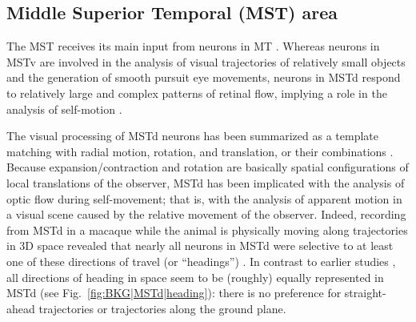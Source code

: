 \subsection{Middle Superior Temporal (MST) area}
\label{sec:BKG|MST}


The \ac{MST} receives its main input from neurons in \ac{MT}
\citep{UngerleiderDesimone1986}.
Whereas neurons in \ac{MSTv} are involved in the analysis of visual
trajectories of relatively small objects and the generation of
smooth pursuit eye movements, 
neurons in \ac{MSTd} respond to relatively large and complex patterns of
retinal flow, implying a role in the analysis of self-motion
\citep{Saito1986, TanakaSaito1989, DuffyWurtz1991a, DuffyWurtz1991b, Gu2010,
Gu2012}.

The visual processing of \ac{MSTd} neurons has been summarized as a
template matching with radial motion, rotation, and translation,
or their combinations \citep{Orban2008}.
Because expansion/contraction and rotation are basically spatial
configurations of local translations of the observer, \ac{MSTd} has been
implicated with the analysis of optic flow during self-movement; 
that is, with the analysis of apparent motion in a visual scene
caused by the relative movement of the observer.
Indeed, recording from \ac{MSTd} in a macaque while the animal is physically
moving along trajectories in 3D space revealed that nearly all neurons in
\ac{MSTd} were selective to at least one of these directions of travel
(or ``headings'') \citep{Gu2006,Takahashi2007}.
In contrast to earlier studies
\citep{DuffyWurtz1991a,DuffyWurtz1991b,Graziano1994},
all directions of heading in space seem to be (roughly) equally 
represented in \ac{MSTd} (see Fig.~\ref{fig:BKG|MSTd|heading}):
there is no preference for straight-ahead trajectories or trajectories
along the ground plane.

